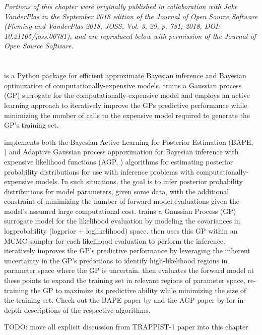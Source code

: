 \textit{Portions of this chapter were originally published in collaboration with Jake VanderPlas in the September 2018 edition of the Journal of Open Source Software (Fleming and VanderPlas 2018, JOSS, Vol. 3, 29, p. 781; 2018, DOI: 10.21105/joss.00781), and are reproduced below with permission of the Journal of Open Source Software.}

\section{\approxposterior}

\approxposterior is a Python package for efficient approximate Bayesian inference and Bayesian optimization of computationally-expensive models. \approxposterior trains a Gaussian process (GP) surrogate for the computationally-expensive model and employs an active learning approach to iteratively improve the GPs predictive performance while minimizing the number of calls to the expensive model required to generate the GP's training set.

\approxposterior implements both the Bayesian Active Learning for Posterior Estimation (BAPE, \citet{Kandasamy2017}) and Adaptive Gaussian process approximation for Bayesian inference with expensive likelihood functions (AGP, \citet{Wang2018}) algorithms for estimating posterior probability distributions for use with inference problems with computationally-expensive models. In such situations, the goal is to infer posterior probability distributions for model parameters, given some data, with the additional constraint of minimizing the number of forward model evaluations given the model's assumed large computational cost. \approxposterior trains a Gaussian Process (GP) surrogate model for the likelihood evaluation by modeling the covariances in logprobability (logprior + loglikelihood) space. \approxposterior then uses this GP within an MCMC sampler for each likelihood evaluation to perform the inference. \approxposterior iteratively improves the GP's predictive performance by leveraging the inherent uncertainty in the GP's predictions to identify high-likelihood regions in parameter space where the GP is uncertain. \approxposterior then evaluates the forward model at these points to expand the training set in relevant regions of parameter space, re-training the GP to maximize its predictive ability while minimizing the size of the training set. Check out the BAPE paper by \citet{Kandasamy2017} and the AGP paper by \citet{Wang2018} for in-depth descriptions of the respective algorithms.

TODO: move all explicit \approxposterior discussion from TRAPPIST-1 paper into this chapter